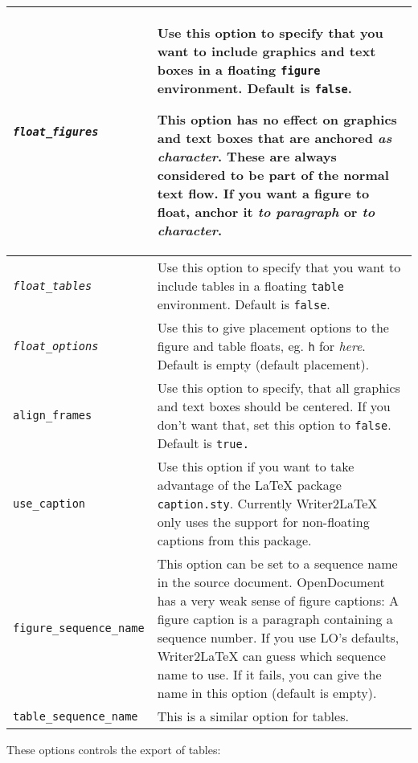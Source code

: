 \documentclass{article}
\newcommand\textstyleSourceText[1]{\texttt{\textmd{#1}}}
\begin{document}
\begin{center}
\begin{tabular}{|m{4.906cm}|m{11.706cm}|}

\hline
{\mdseries \textstyleSourceText{\emph{float\_figures}}} &
{\mdseries Use this option to specify that you want to include graphics and text boxes in a floating \textstyleSourceText{figure} environment. Default is \textstyleSourceText{false}.}

{\mdseries This option has no effect on graphics and text boxes that are anchored \emph{as character}. These are always considered to be part of the normal text flow. If you want a figure to float, anchor it \emph{to paragraph} or \emph{to character}.}\\\hline
{\mdseries \textstyleSourceText{\emph{float\_tables}}} &
{\mdseries Use this option to specify that you want to include tables in a floating \textstyleSourceText{table} environment. Default is \textstyleSourceText{false}.}\\\hline
{\mdseries \textstyleSourceText{\emph{float\_options}}} &
{\mdseries Use this to give placement options to the figure and table floats, eg. \textstyleSourceText{h} for \emph{here}. Default is empty (default placement).}\\\hline
{\mdseries \textstyleSourceText{align\_frames}} &
{\mdseries Use this option to specify, that all graphics and text boxes should be centered. If you don't want that, set this option to \textstyleSourceText{false}. Default is \textstyleSourceText{true.}}\\\hline
{\mdseries \textstyleSourceText{use\_caption}} &
{\mdseries Use this option if you want to take advantage of the LaTeX package \textstyleSourceText{caption.sty}. Currently Writer2LaTeX only uses the support for non-floating captions from this package.}\\\hline
{\mdseries \textstyleSourceText{figure\_sequence\_name}} &
{\mdseries This option can be set to a sequence name in the source document. OpenDocument has a very weak sense of figure captions: A figure caption is a paragraph containing a sequence number. If you use LO's defaults, Writer2LaTeX can guess which sequence name to use. If it fails, you can give the name in this option (default is empty).}\\\hline
{\mdseries \textstyleSourceText{table\_sequence\_name}} &
{\mdseries This is a similar option for tables.}\\\hline
\end{tabular}
\end{center}
{\mdseries
These options controls the export of tables:}
\end{document}

